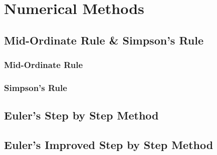 \documentclass[../alevelmaths.tex]{subfiles}
\begin{document}
\chapter{Numerical Methods}
\section{Mid-Ordinate Rule \& Simpson's Rule}
\subsection*{Mid-Ordinate Rule}
\subsection*{Simpson's Rule}
\section{Euler's Step by Step Method}
\section{Euler's Improved Step by Step Method}
\end{document}
